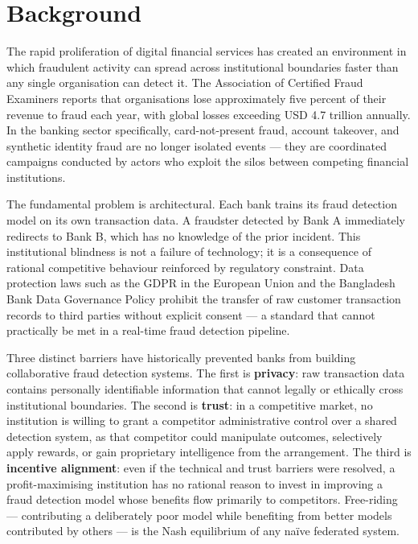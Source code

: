 \section{Background}
The rapid proliferation of digital financial services has created an environment in which fraudulent activity can spread across institutional boundaries faster than any single organisation can detect it. The Association of Certified Fraud Examiners reports that organisations lose approximately five percent of their revenue to fraud each year, with global losses exceeding USD 4.7 trillion annually\cite{acfe2022}. In the banking sector specifically, card-not-present fraud, account takeover, and synthetic identity fraud are no longer isolated events — they are coordinated campaigns conducted by actors who exploit the silos between competing financial institutions\cite{acfe2022}.

The fundamental problem is architectural. Each bank trains its fraud detection model on its own transaction data. A fraudster detected by Bank A immediately redirects to Bank B, which has no knowledge of the prior incident. This institutional blindness is not a failure of technology; it is a consequence of rational competitive behaviour reinforced by regulatory constraint. Data protection laws such as the GDPR in the European Union and the Bangladesh Bank Data Governance Policy prohibit the transfer of raw customer transaction records to third parties without explicit consent — a standard that cannot practically be met in a real-time fraud detection pipeline.

Three distinct barriers have historically prevented banks from building collaborative fraud detection systems. The first is \textbf{privacy}: raw transaction data contains personally identifiable information that cannot legally or ethically cross institutional boundaries. The second is \textbf{trust}: in a competitive market, no institution is willing to grant a competitor administrative control over a shared detection system, as that competitor could manipulate outcomes, selectively apply rewards, or gain proprietary intelligence from the arrangement. The third is \textbf{incentive alignment}: even if the technical and trust barriers were resolved, a profit-maximising institution has no rational reason to invest in improving a fraud detection model whose benefits flow primarily to competitors. Free-riding — contributing a deliberately poor model while benefiting from better models contributed by others — is the Nash equilibrium of any na\"ive federated system.

